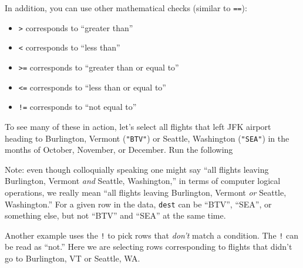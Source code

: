 \documentclass[12pt,]{krantz}
\makeatletter
\newenvironment{Shaded}{\begin{snugshade}}{\end{snugshade}}
\newcommand{\KeywordTok}[1]{\textcolor[rgb]{0.27,0.27,0.27}{\textbf{#1}}}
\newcommand{\DecValTok}[1]{\textcolor[rgb]{0.06,0.06,0.06}{#1}}
\newcommand{\StringTok}[1]{\textcolor[rgb]{0.5,0.5,0.5}{#1}}
\newcommand{\OperatorTok}[1]{\textcolor[rgb]{0.43,0.43,0.43}{\textbf{#1}}}
\newcommand{\NormalTok}[1]{#1}
\providecommand{\tightlist}{%
  \setlength{\itemsep}{0pt}\setlength{\parskip}{0pt}}
\newenvironment{kframe}{%
\medskip{}
\setlength{\fboxsep}{.8em}
 \def\at@end@of@kframe{}%
 \ifinner\ifhmode%
  \def\at@end@of@kframe{\end{minipage}}%
  \begin{minipage}{\columnwidth}%
 \fi\fi%
 \def\FrameCommand##1{\hskip\@totalleftmargin \hskip-\fboxsep
 \colorbox{shadecolor}{##1}\hskip-\fboxsep
     \hskip-\linewidth \hskip-\@totalleftmargin \hskip\columnwidth}%
 \MakeFramed {\advance\hsize-\width
   \@totalleftmargin\z@ \linewidth\hsize
   \@setminipage}}%
 {\par\unskip\endMakeFramed%
 \at@end@of@kframe}
\renewenvironment{Shaded}{\begin{kframe}}{\end{kframe}}
\theoremstyle{definition}
\theoremstyle{definition}
\theoremstyle{definition}
\theoremstyle{remark}
\makeatother
\begin{document}
In addition, you can use other mathematical checks (similar to
\texttt{==}):

\begin{itemize}
\tightlist
\item
  \texttt{\textgreater{}} corresponds to ``greater than''
\item
  \texttt{\textless{}} corresponds to ``less than''
\item
  \texttt{\textgreater{}=} corresponds to ``greater than or equal to''
\item
  \texttt{\textless{}=} corresponds to ``less than or equal to''
\item
  \texttt{!=} corresponds to ``not equal to''
\end{itemize}

To see many of these in action, let's select all flights that left JFK
airport heading to Burlington, Vermont (\texttt{"BTV"}) or Seattle,
Washington (\texttt{"SEA"}) in the months of October, November, or
December. Run the following

\begin{Shaded}
\end{Shaded}

Note: even though colloquially speaking one might say ``all flights
leaving Burlington, Vermont \emph{and} Seattle, Washington,'' in terms
of computer logical operations, we really mean ``all flights leaving
Burlington, Vermont \emph{or} Seattle, Washington.'' For a given row in
the data, \texttt{dest} can be ``BTV'', ``SEA'', or something else, but
not ``BTV'' and ``SEA'' at the same time.

Another example uses the \texttt{!} to pick rows that \emph{don't} match
a condition. The \texttt{!} can be read as ``not.'' Here we are
selecting rows corresponding to flights that didn't go to Burlington, VT
or Seattle, WA.

\begin{Shaded}
\end{Shaded}
\end{document}

